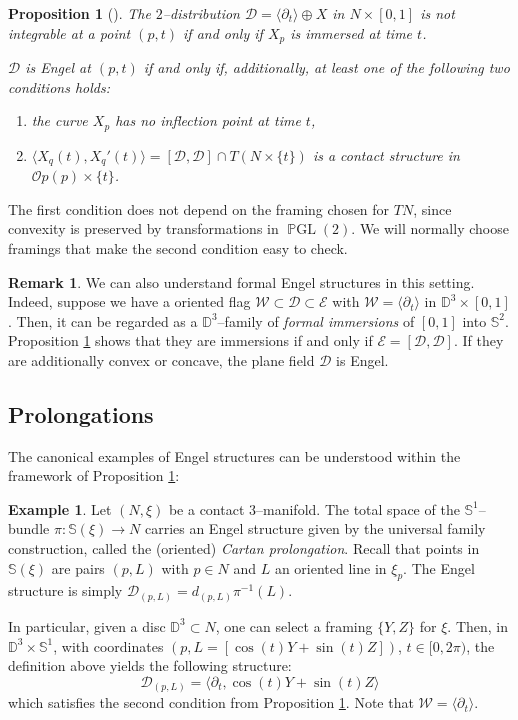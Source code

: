 \documentclass[10pt]{amsart}
\newcommand{\SE}{{\mathcal{E}}}
\newcommand{\SD}{{\mathcal{D}}}
\newcommand{\SW}{{\mathcal{W}}}
\newcommand{\PGL}{\operatorname{\mathbb{P}GL}}
\newcommand{\NS}{{\mathbb{S}}}
\newcommand{\D}{{\mathbb{D}}}
\newcommand{\Op}{{\mathcal{O}p}}
\newtheorem{proposition}{Proposition}
\theoremstyle{definition}
\newtheorem{remark}{Remark}
\newtheorem{example}{Example}
\begin{document}
\begin{proposition}[\cite{CPPP}] \label{prop:key}
The $2$--distribution $\SD = \langle \partial_t \rangle \oplus X$ in $N \times [0,1]$ is not integrable at a point $(p,t)$ if and only if $X_p$ is immersed at time $t$.

$\SD$ is Engel at $(p,t)$ if and only if, additionally, at least one of the following two conditions holds:
\begin{enumerate}
  \item the curve $X_p$ has no inflection point at time $t$,
  \item $\langle X_q(t),X_q'(t) \rangle = [\SD, \SD] \cap T(N \times \{t\})$ is a contact structure in $\Op(p)\times\{t\}$.
\end{enumerate}
\end{proposition}
The first condition does not depend on the framing chosen for $TN$, since convexity is preserved by transformations in $\PGL(2)$. We will normally choose framings that make the second condition easy to check.

\begin{remark}
We can also understand formal Engel structures in this setting. Indeed, suppose we have a oriented flag $\SW \subset \SD \subset \SE$ with $\SW = \langle \partial_t \rangle$ in $\D^3 \times [0,1]$. Then, it can be regarded as a $\D^3$--family of \emph{formal immersions} of $[0,1]$ into $\NS^2$. Proposition \ref{prop:key} shows that they are immersions if and only if $\SE = [\SD,\SD]$. If they are additionally convex or concave, the plane field $\SD$ is Engel.
\end{remark}


\subsection{Prolongations} \label{ssec:prolongations}

The canonical examples of Engel structures can be understood within the framework of Proposition \ref{prop:key}:

\begin{example} \label{ex:Cartan}
Let $(N, \xi)$ be a contact $3$--manifold. The total space of the $\mathbb{S}^1$--bundle $\pi: \mathbb{S}(\xi) \to N$ carries an Engel structure given by the universal family construction, called the (oriented) \textsl{Cartan prolongation}. Recall that points in $\mathbb{S}(\xi)$ are pairs $(p,L)$ with $p \in N$ and $L$ an oriented line in $\xi_p$. The Engel structure is simply $\SD_{(p,L)} = d_{(p,L)}\pi^{-1}(L)$. 

In particular, given a disc $\D^3 \subset N$, one can select a framing $\{Y,Z\}$ for $\xi$. Then, in $\D^3 \times \mathbb{S}^1$, with coordinates $(p,L = [\cos(t)Y + \sin(t)Z])$, $t \in [0,2\pi)$, the definition above yields the following structure:
\[ \SD_{(p,L)} = \langle \partial_t, \cos(t)Y + \sin(t)Z \rangle \]
which satisfies the second condition from Proposition \ref{prop:key}. Note that $\SW = \langle \partial_t \rangle$.
\end{example}
\end{document}
